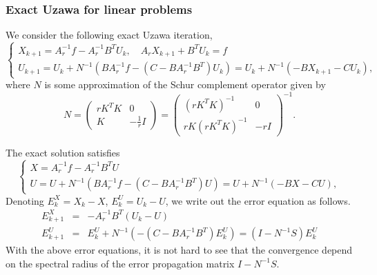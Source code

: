 \subsubsection{Exact Uzawa for linear problems}
We consider the following exact Uzawa iteration,
\begin{equation}
    \begin{cases}
     X_{k+1} = A_r^{-1}f - A_r^{-1}B^T U_k, \quad A_r X_{k+1} +B^T U_k = f \\
     U_{k+1} = U_k + N^{-1} \left( B A_r^{-1} f - (C - B A_r^{-1}B^T)U_k \right) = U_k + N^{-1} \left( - B X_{k+1} - C U_k\right),
    \end{cases}
\end{equation}
where $N$ is some approximation of the Schur complement operator given by 
\begin{equation}
    N = \begin{pmatrix}
    r K^T K & 0\\
     K & - \frac{1}{r} I
    \end{pmatrix} = \begin{pmatrix}
     (r K^T K)^{-1} &  0 \\
    r K (r K^T K)^{-1} & -r I
    \end{pmatrix}^{-1}.
\end{equation}

The exact solution satisfies 
\begin{equation}
    \begin{cases}
     X = A_r^{-1}f - A_r^{-1}B^T U \\
     U = U + N^{-1} \left( B A_r^{-1} f - (C - B A_r^{-1}B^T)U \right) = U + N^{-1} \left( - B X - C U\right),
    \end{cases}
\end{equation}
Denoting $E^X_{k} = X_{k} - X$, $E^U_{k} = U_k - U$, we write out the error equation as follows.
\begin{eqnarray}
E^X_{k+1} &=& - A_r^{-1}B^T (U_k - U) \\
E^U_{k+1} &=& E^U_{k} + N^{-1} \left( -(C - B A_r^{-1}B^T) E^{U}_k \right) = (I - N^{-1}S) E^U_{k}
\end{eqnarray}
With the above error equations, it is not hard to see that the convergence depend on the spectral radius of the error propagation matrix $I - N^{-1}S$. 


